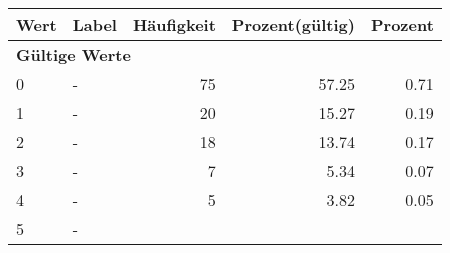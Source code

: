     \begin{longtable}{lXrrr}
     \toprule
     \textbf{Wert} & \textbf{Label} & \textbf{Häufigkeit} & \textbf{Prozent(gültig)} & \textbf{Prozent} \\
     \endhead
     \midrule
     \multicolumn{5}{l}{\textbf{Gültige Werte}}\\

     0 &
     \multicolumn{1}{X}{ -  } &


       \num{75} &
       \num[round-mode=places,round-precision=2]{57,25} &
         \num[round-mode=places,round-precision=2]{0,71} \\

     1 &
     \multicolumn{1}{X}{ -  } &


       \num{20} &
       \num[round-mode=places,round-precision=2]{15,27} &
         \num[round-mode=places,round-precision=2]{0,19} \\

     2 &
     \multicolumn{1}{X}{ -  } &


       \num{18} &
       \num[round-mode=places,round-precision=2]{13,74} &
         \num[round-mode=places,round-precision=2]{0,17} \\

     3 &
     \multicolumn{1}{X}{ -  } &


       \num{7} &
       \num[round-mode=places,round-precision=2]{5,34} &
         \num[round-mode=places,round-precision=2]{0,07} \\

     4 &
     \multicolumn{1}{X}{ -  } &


       \num{5} &
       \num[round-mode=places,round-precision=2]{3,82} &
         \num[round-mode=places,round-precision=2]{0,05} \\

     5 &
     \multicolumn{1}{X}{ -  } &



\end{longtable}
